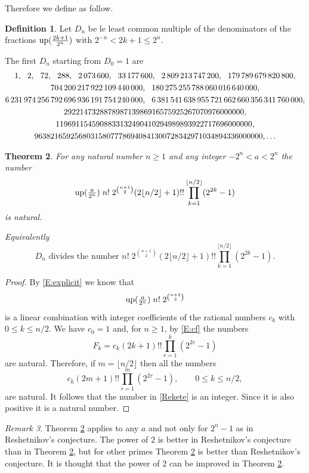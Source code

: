 \documentclass[10pt]{amsart}
\newtheorem{thm}{Theorem}
\theoremstyle{definition}
\newtheorem{defn}[thm]{Definition}
\theoremstyle{remark}
\newtheorem{rem}[thm]{Remark}
\def\nn{\mskip12mu}
\begin{document}
Therefore we define as follow.
\begin{defn} Let $D_n$ be le least common multiple of the denominators of the
fractions $\operatorname{up}(\frac{2k+1}{2^n})$ with $2^{-n}<2k+1\le2^n$.
\end{defn}

The first $D_n$ starting from $D_0=1$ are
\begin{gather*}
1,\nn 2,\nn 72,\nn 288,\nn 2\,073\,600,\nn 33\,177\,600,\nn 2\,809\,213\,747\,200,\nn 179\,789\,679\,820\,800,\\
704\,200\,217\,922\,109\,440\,000,\nn 180\,275\,255\,788\,060\,016\,640\,000,\\
6\,231\,974\,256\,792\,696\,936\,191\,754\,240\,000,\nn 6\,381\,541\,638\,955\,721\,662\,660\,356\,341\,760\,000,\\
292214732887898713986916575925267070976000000,\\
1196911545908833132490410294989893922717696000000,\\
963821659256803158077786940841300728342971034894336000000,\dots
\end{gather*}




\begin{thm}\label{T:9}
For any natural number $n\ge1$ and any integer $-2^n< a< 2^n$ the number
\begin{equation}\label{Rekete}
\operatorname{up}(\tfrac{a}{2^n})\;n!\;2^{\binom{n+1}{2}}(2\lfloor n/2\rfloor+1)!! \prod_{k=1}^{\lfloor n/2\rfloor}(2^{2k}-1)
\end{equation}
is natural.

Equivalently
\[D_n\text{ divides the number } n!\;2^{\binom{n+1}{2}}(2\lfloor n/2\rfloor+1)!! \prod_{k=1}^{\lfloor n/2\rfloor}(2^{2k}-1).\]


\end{thm}

\begin{proof}
By \eqref{E:explicit} we know that
\[\operatorname{up}(\tfrac{a}{2^n})\;n!\;2^{\binom{n+1}{2}}\]
is a linear combination with integer coefficients of the rational numbers $c_k$ with
$0\le k\le n/2$. We have $c_0=1$ and, for $n\ge1$, by \eqref{E:cf} the numbers
\[F_k = c_k(2k+1)!! \prod_{r=1}^{k}(2^{2r}-1)\]
are natural. Therefore, if $m=\lfloor n/2\rfloor$ then all the numbers
\[c_k (2m+1)!! \prod_{r=1}^{m}(2^{2r}-1), \qquad 0\le k\le n/2,\]
are natural.  It follows that the number in \eqref{Rekete} is an integer. Since
it is also positive it is a natural number.
\end{proof}
\begin{rem}
Theorem \ref{T:9} applies to any $a$ and not only for $2^n-1$ as in Reshetnikov's conjecture.
The power of $2$ is better in Reshetnikov's conjecture than in Theorem \ref{T:9}, but
for other primes  Theorem \ref{T:9} is better than Reshetnikov's conjecture.  It is thought that
the power of $2$ can be improved in Theorem \ref{T:9}.
\end{rem}
\end{document}

